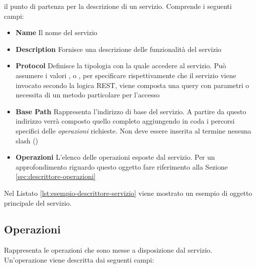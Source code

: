 \upe il punto di partenza per la descrizione di un servizio. Comprende i seguenti campi:

\begin{itemize}
	\item \textbf{Name} Il nome del servizio
	\item \textbf{Description} Fornisce una descrizione delle funzionalità del servizio
	\item \textbf{Protocol} Definisce la tipologia con la quale accedere al servizio. Può assumere i valori ,  o , per specificare rispettivamente che il servizio viene invocato secondo la logica REST, viene composta una query con parametri o necessita di un metodo particolare per l'accesso
	\item \textbf{Base Path} Rappresenta l'indirizzo di base del servizio. A partire da questo indirizzo verrà composto quello completo aggiungendo in coda i percorsi specifici delle \emph{operazioni} richieste. Non deve essere inserita al termine nessuna slash (\virgolette{/})
	\item \textbf{Operazioni} L'elenco delle operazioni esposte dal servizio. Per un approfondimento riguardo questo oggetto fare riferimento alla Sezione \ref{sec:descrittore-operazioni}
\end{itemize}

Nel Listato \ref{lst:esempio-descrittore-servizio} viene mostrato un esempio di oggetto principale del servizio.



\subsection{Operazioni\label{sec:descrittore-operazioni}}

Rappresenta le operazioni che sono messe a disposizione dal servizio. Un'operazione viene descritta dai seguenti campi:

